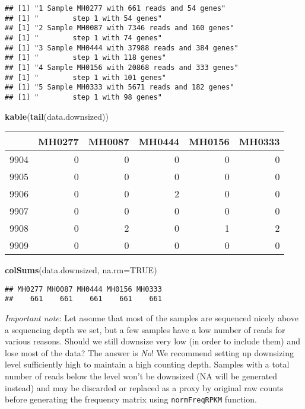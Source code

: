 \documentclass[]{article}
\newenvironment{Shaded}{\begin{snugshade}}{\end{snugshade}}
\newcommand{\KeywordTok}[1]{\textcolor[rgb]{0.13,0.29,0.53}{\textbf{{#1}}}}
\newcommand{\DataTypeTok}[1]{\textcolor[rgb]{0.13,0.29,0.53}{{#1}}}
\newcommand{\OtherTok}[1]{\textcolor[rgb]{0.56,0.35,0.01}{{#1}}}
\newcommand{\NormalTok}[1]{{#1}}
\begin{document}
\begin{verbatim}
## [1] "1 Sample MH0277 with 661 reads and 54 genes"
## [1] "        step 1 with 54 genes"
## [1] "2 Sample MH0087 with 7346 reads and 160 genes"
## [1] "        step 1 with 74 genes"
## [1] "3 Sample MH0444 with 37988 reads and 384 genes"
## [1] "        step 1 with 118 genes"
## [1] "4 Sample MH0156 with 20868 reads and 333 genes"
## [1] "        step 1 with 101 genes"
## [1] "5 Sample MH0333 with 5671 reads and 182 genes"
## [1] "        step 1 with 98 genes"
\end{verbatim}

\begin{Shaded}
\begin{Highlighting}[]
\KeywordTok{kable}\NormalTok{(}\KeywordTok{tail}\NormalTok{(data.downsized))}
\end{Highlighting}
\end{Shaded}

\begin{longtable}[c]{@{}lrrrrr@{}}
\toprule
& MH0277 & MH0087 & MH0444 & MH0156 & MH0333\tabularnewline
\midrule
\endhead
9904 & 0 & 0 & 0 & 0 & 0\tabularnewline
9905 & 0 & 0 & 0 & 0 & 0\tabularnewline
9906 & 0 & 0 & 2 & 0 & 0\tabularnewline
9907 & 0 & 0 & 0 & 0 & 0\tabularnewline
9908 & 0 & 2 & 0 & 1 & 2\tabularnewline
9909 & 0 & 0 & 0 & 0 & 0\tabularnewline
\bottomrule
\end{longtable}

\begin{Shaded}
\begin{Highlighting}[]
\KeywordTok{colSums}\NormalTok{(data.downsized, }\DataTypeTok{na.rm=}\OtherTok{TRUE}\NormalTok{)}
\end{Highlighting}
\end{Shaded}

\begin{verbatim}
## MH0277 MH0087 MH0444 MH0156 MH0333 
##    661    661    661    661    661
\end{verbatim}

\emph{Important note}: Let assume that most of the samples are sequenced
nicely above a sequencing depth we set, but a few samples have a low
number of reads for various reasons. Should we still downsize very low
(in order to include them) and lose most of the data? The answer is
\emph{No}! We recommend setting up downsizing level sufficiently high to
maintain a high counting depth. Samples with a total number of reads
below the level won't be downsized (NA will be generated instead) and
may be discarded or replaced as a proxy by original raw counts before
generating the frequency matrix using \texttt{normFreqRPKM} function.
\end{document}
